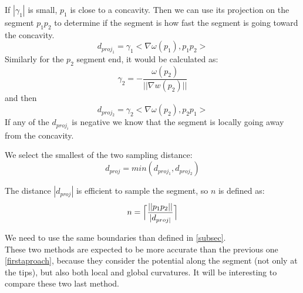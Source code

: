 \documentclass[11pt,a4paper]{article}
\begin{document}
If $|\gamma_1|$ is small, $p_1$ is close to a concavity. 
Then we can use its projection on the segment $p_1p_2$ to determine if the segment is how fast the segment is going toward the concavity.
\begin{equation}
 d_{proj_1} = \gamma_1<\nabla \omega(p_1), p_1p_2>
\end{equation}
Similarly for the $p_2$ segment end, it would be calculated  as:
\begin{equation}
\gamma_2 = - \frac{\omega(p_2)}{||\nabla w(p_2)||} 
\end{equation}
and then
\begin{equation}
 d_{proj_2} = \gamma_2<\nabla \omega(p_2), p_2p_1>
\end{equation}
If any of the $d_{proj_i}$ is negative we know that the segment is locally going away from the concavity.

We select the smallest of the two sampling distance:
\begin{equation}
d_{proj} = min(d_{proj_1}, d_{proj_2})
\end{equation}

The distance $|d_{proj}|$ is efficient to sample the segment, so $n$ is defined as:
\begin{equation}
n = \Bigl\lceil\frac{||p_1p_2||}{|d_{proj|}}\Bigr\rceil
\end{equation}

We need to use the same boundaries than defined in \ref{subsec}.\\




These two methods are expected to be more accurate than the previous one \ref{firstaproach}, because they consider the potential along the segment (not only at the tips), but also both local and global curvatures.
It will be interesting to compare these two last method.




	
\end{document}
